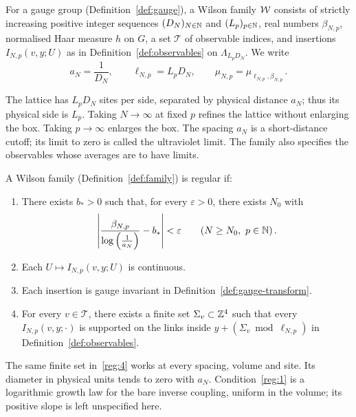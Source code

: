 \begin{definition}\label{def:family}
For a gauge group (Definition~\ref{def:gauge}), a Wilson family $\mathcal W$ consists of strictly increasing positive integer sequences $(D_N)_{N\in\mathbb N}$ and $(L_p)_{p\in\mathbb N}$, real numbers $\beta_{N,p}$, normalised Haar measure $h$ on $G$, a set $\mathcal T$ of observable indices, and insertions $I_{N,p}(v,y;U)$ as in Definition~\ref{def:observables} on $\Lambda_{L_pD_N}$.
We write
\begin{equation}\label{eq:physical-scales}
a_N=\frac{1}{D_N},\qquad \ell_{N,p}=L_pD_N,\qquad
\mu_{N,p}=\mu_{\ell_{N,p},\beta_{N,p}}\,.
\end{equation}
\end{definition}

The lattice has $L_pD_N$ sites per side, separated by physical distance $a_N$; thus its physical side is $L_p$.
Taking $N\to\infty$ at fixed $p$ refines the lattice without enlarging the box.
Taking $p\to\infty$ enlarges the box.
The spacing $a_N$ is a short-distance cutoff; its limit to zero is called the ultraviolet limit.
The family also specifies the observables whose averages are to have limits.

\begin{definition}[Regularity]\label{def:regular}
A Wilson family (Definition~\ref{def:family}) is regular if:
\begin{enumerate}[label=\textup{Reg\arabic*.},ref=Reg\arabic*]
\item\label{reg:1} There exists $b_*>0$ such that, for every $\varepsilon>0$, there exists $N_0$ with
\begin{equation}\label{eq:running}
\left|\frac{\beta_{N,p}}{\log\left(\frac{1}{a_N}\right)}-b_*\right|<\varepsilon
\qquad(N\ge N_0,\ p\in\mathbb N)\,.
\end{equation}
\item\label{reg:2} Each $U\mapsto I_{N,p}(v,y;U)$ is continuous.
\item\label{reg:3} Each insertion is gauge invariant in Definition~\ref{def:gauge-transform}.
\item\label{reg:4} For every $v\in\mathcal T$, there exists a finite set $\Sigma_v\subset\mathbb Z^4$ such that every $I_{N,p}(v,y;\cdot)$ is supported on the links inside $y+(\Sigma_v\bmod\ell_{N,p})$ in Definition~\ref{def:observables}.
\end{enumerate}
\end{definition}

The same finite set in~\ref{reg:4} works at every spacing, volume and site.
Its diameter in physical units tends to zero with $a_N$.
Condition~\ref{reg:1} is a logarithmic growth law for the bare inverse coupling, uniform in the volume; its positive slope is left unspecified here.

